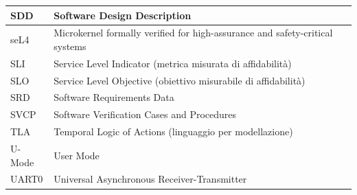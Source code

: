 \documentclass[italian, Lau, oneside]{sapthesis} %
\begin{document}
\begin{table}[h!]
\begin{tabular}{|l|p{10cm}|}
SDD     & Software Design Description \\ \hline
seL4    & Microkernel formally verified for high-assurance and safety-critical systems \\ \hline
SLI     & Service Level Indicator (metrica misurata di affidabilità) \\ \hline
SLO     & Service Level Objective (obiettivo misurabile di affidabilità) \\ \hline
SRD     & Software Requirements Data \\ \hline
SVCP    & Software Verification Cases and Procedures \\ \hline
TLA     & Temporal Logic of Actions (linguaggio per modellazione) \\ \hline
U-Mode       & User Mode \\ \hline
UART0   & Universal Asynchronous Receiver-Transmitter \\ \hline
\end{tabular}
\end{table}

\newpage
{}
\listoffigures
\newpage

\backmatter
{}
\end{document}
